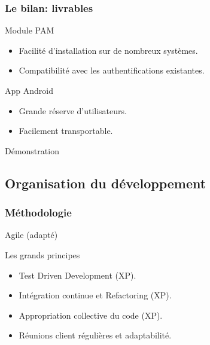 \documentclass[xcolor=table]{beamer}
\begin{document}
\begin{frame}
\frametitle{Le bilan: livrables}
\begin{block}{Module PAM}
\begin{itemize}
\item Facilité d'installation sur de nombreux systèmes.
\item Compatibilité avec les authentifications existantes.
\end{itemize}
\end{block}

\begin{block}{App Android}
\begin{itemize}
\item Grande réserve d'utilisateurs.
\item Facilement transportable.
\end{itemize}
\end{block} 
\end{frame}

\begin{frame}
\begin{center}
\Huge{Démonstration}
\end{center}
\end{frame}


\subsection{Organisation du développement}

\begin{frame}
\frametitle{Méthodologie}
\begin{center}
\Huge Agile (adapté)
\normalsize
\begin{block}{Les grands principes}
\begin{itemize}
 \item Test Driven Development (XP).
 \item Intégration continue et Refactoring (XP).
 \item Appropriation collective du code (XP).
 \item Réunions client régulières et adaptabilité.
\end{itemize}
\end{block}
\end{center}

\end{frame}
\end{document}
